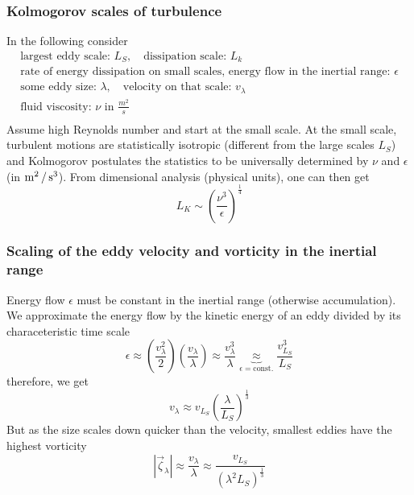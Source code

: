 \subsubsection{Kolmogorov scales of turbulence}
In the following consider
\begin{equation}
    \begin{gathered}
        \text{largest eddy scale: } L_S, \quad \text{dissipation scale: } L_k \\
        \text{rate of energy dissipation on small scales, energy flow in the inertial range: } \epsilon \\
        \text{some eddy size: } \lambda, \quad \text{velocity on that scale: } v_\lambda \\
        \text{fluid viscosity: } \nu \text{ in } \frac{m^2}{s} \\
    \end{gathered}
\end{equation}
Assume high Reynolds number and start at the small scale. At the small scale, turbulent motions are statistically
isotropic (different from the large scales $L_S$) and Kolmogorov postulates the statistics to be universally
determined by $\nu$ and $\epsilon$ (in $\operatorname{m}^2 / \operatorname{s}^3$). From dimensional analysis (physical units), one can then
get
\begin{equation}
    L_K \sim \left( \frac{\nu^3}{\epsilon} \right)^{\frac{1}{4}}
\end{equation}

\subsubsection{Scaling of the eddy velocity and vorticity in the inertial range}
Energy flow $\epsilon$ must be constant in the inertial range (otherwise accumulation).
We approximate the energy flow by the kinetic energy of an eddy divided by its characeteristic time scale
\begin{equation}
    \epsilon \approx \left( \frac{v_\lambda^2}{2} \right) \left(\frac{v_\lambda}{\lambda} \right) \approx \frac{v_\lambda^3}{\lambda} \underbrace{\approx}_{\epsilon = \text{const.}} \frac{v_{L_S}^3}{L_S}
\end{equation}
therefore, we get
\begin{equation}
    v_\lambda \approx v_{L_S} \left( \frac{\lambda}{L_S} \right)^{\frac{1}{3}}
\end{equation}
But as the size scales down quicker than the velocity, smallest eddies have the highest vorticity
\begin{equation}
    |\vec{\zeta}_\lambda| \approx \frac{v_\lambda}{\lambda} \approx \frac{v_{L_S}}{(\lambda^2 L_S)^{\frac{1}{3}}}
\end{equation}

